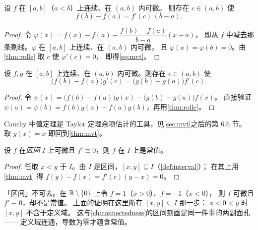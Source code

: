 \begin{theorem}
  \label{thm:mvt}
  设 \(f\) 在 \([a,b]\)（\(a<b\)）上连续、在 \((a,b)\) 内可微。
  则存在 \(c \in (a,b)\) 使
  \begin{equation}
    \label{eq:mvt}
    f(b)-f(a) = f'(c)\,(b-a) .
  \end{equation}
\end{theorem}

\begin{proof}
  令 \(\varphi(x) = f(x) - f(a) - \dfrac{f(b)-f(a)}{b-a}(x-a)\)，
  即从 \(f\) 中减去那条割线。\(\varphi\) 在 \([a,b]\) 上连续、在 \((a,b)\) 内可微，
  且 \(\varphi(a)=\varphi(b)=0\)。由\cref{thm:rolle} 取 \(c\) 使 \(\varphi'(c)=0\)，
  即得\cref{eq:mvt}。
\end{proof}

\begin{theorem}
  \label{thm:cauchy-mvt}
  设 \(f,g\) 在 \([a,b]\) 上连续、在 \((a,b)\) 内可微。则存在 \(c \in (a,b)\) 使
  \[
    \bigl(f(b)-f(a)\bigr)g'(c) = \bigl(g(b)-g(a)\bigr)f'(c) .
  \]
\end{theorem}

\begin{proof}
  令 \(\psi(x) = \bigl(f(b)-f(a)\bigr)g(x) - \bigl(g(b)-g(a)\bigr)f(x)\)。
  直接验证 \(\psi(a)=\psi(b)=f(b)g(a)-f(a)g(b)\)，再用\cref{thm:rolle}。
\end{proof}

\begin{remark}
  Cauchy 中值定理是 Taylor 定理余项估计的工具，见\cref{sec:mvt}之后的第 6.6 节。
  取 \(g(x)=x\) 即回到\cref{thm:mvt}。
\end{remark}

\begin{corollary}
  \label{cor:zero-derivative}
  设 \(f\) 在\emph{区间} \(I\) 上可微且 \(f' \equiv 0\)，则 \(f\) 在 \(I\) 上是常值。
\end{corollary}

\begin{proof}
  任取 \(x<y\) 于 \(I\)。由 \(I\) 是区间，\([x,y] \subseteq I\)（\cref{def:interval}）；
  在其上用\cref{thm:mvt} 得 \(f(y)-f(x) = f'(c)(y-x) = 0\)。
\end{proof}

\begin{pitfall}
  「区间」不可去。在 \(\mathbb{R} \setminus \left\{0\right\}\) 上令 \(f=1\)（\(x>0\)）、\(f=-1\)（\(x<0\)），
  则 \(f\) 可微且 \(f' \equiv 0\)，却不是常值。
  上面的证明在这里断在 \([x,y] \subseteq I\) 那一步：
  \(x<0<y\) 时 \([x,y]\) 不含于定义域。
  这与\cref{ch:connectedness}的区间刻画是同一件事的两副面孔——
  定义域连通，导数为零才蕴含常值。
\end{pitfall}

